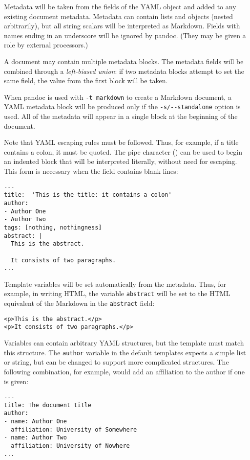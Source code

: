 \documentclass[]{article}
\begin{document}
Metadata will be taken from the fields of the YAML object and added to
any existing document metadata. Metadata can contain lists and objects
(nested arbitrarily), but all string scalars will be interpreted as
Markdown. Fields with names ending in an underscore will be ignored by
pandoc. (They may be given a role by external processors.)

A document may contain multiple metadata blocks. The metadata fields
will be combined through a \emph{left-biased union}: if two metadata
blocks attempt to set the same field, the value from the first block
will be taken.

When pandoc is used with \texttt{-t\ markdown} to create a Markdown
document, a YAML metadata block will be produced only if the
\texttt{-s/-\/-standalone} option is used. All of the metadata will
appear in a single block at the beginning of the document.

Note that YAML escaping rules must be followed. Thus, for example, if a
title contains a colon, it must be quoted. The pipe character
(\texttt{\textbar{}}) can be used to begin an indented block that will
be interpreted literally, without need for escaping. This form is
necessary when the field contains blank lines:

\begin{verbatim}
---
title:  'This is the title: it contains a colon'
author:
- Author One
- Author Two
tags: [nothing, nothingness]
abstract: |
  This is the abstract.

  It consists of two paragraphs.
...
\end{verbatim}

Template variables will be set automatically from the metadata. Thus,
for example, in writing HTML, the variable \texttt{abstract} will be set
to the HTML equivalent of the Markdown in the \texttt{abstract} field:

\begin{verbatim}
<p>This is the abstract.</p>
<p>It consists of two paragraphs.</p>
\end{verbatim}

Variables can contain arbitrary YAML structures, but the template must
match this structure. The \texttt{author} variable in the default
templates expects a simple list or string, but can be changed to support
more complicated structures. The following combination, for example,
would add an affiliation to the author if one is given:

\begin{verbatim}
---
title: The document title
author:
- name: Author One
  affiliation: University of Somewhere
- name: Author Two
  affiliation: University of Nowhere
...
\end{verbatim}
\end{document}
